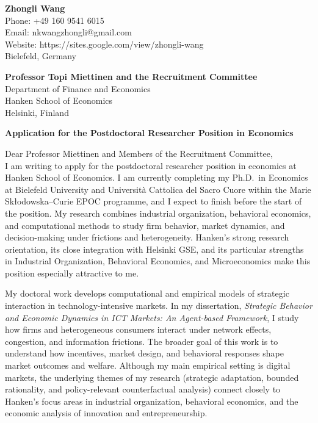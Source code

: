 \documentclass[11pt]{article}
\begin{document}
\noindent
\textbf{Zhongli Wang} \\
Phone: +49 160 9541 6015 \\
Email: nkwangzhongli@gmail.com \\
Website: https://sites.google.com/view/zhongli-wang \\
Bielefeld, Germany \\

\vspace{0.5cm}

\noindent
\textbf{Professor Topi Miettinen and the Recruitment Committee} \\
Department of Finance and Economics \\
Hanken School of Economics \\
Helsinki, Finland \\

\vspace{0.5cm}

\noindent
\textbf{Application for the Postdoctoral Researcher Position in Economics} \\

\vspace{0.3cm}

\noindent Dear Professor Miettinen and Members of the Recruitment Committee,\\[0.2cm]

I am writing to apply for the postdoctoral researcher position in economics at Hanken School of Economics. I am currently completing my Ph.D.\ in Economics at Bielefeld University and Università Cattolica del Sacro Cuore within the Marie Skłodowska--Curie EPOC programme, and I expect to finish before the start of the position. My research combines industrial organization, behavioral economics, and computational methods to study firm behavior, market dynamics, and decision-making under frictions and heterogeneity. Hanken's strong research orientation, its close integration with Helsinki GSE, and its particular strengths in Industrial Organization, Behavioral Economics, and Microeconomics make this position especially attractive to me.

My doctoral work develops computational and empirical models of strategic interaction in technology-intensive markets. In my dissertation, \textit{Strategic Behavior and Economic Dynamics in ICT Markets: An Agent-based Framework}, I study how firms and heterogeneous consumers interact under network effects, congestion, and information frictions. The broader goal of this work is to understand how incentives, market design, and behavioral responses shape market outcomes and welfare. Although my main empirical setting is digital markets, the underlying themes of my research (strategic adaptation, bounded rationality, and policy-relevant counterfactual analysis) connect closely to Hanken's focus areas in industrial organization, behavioral economics, and the economic analysis of innovation and entrepreneurship.
\end{document}
